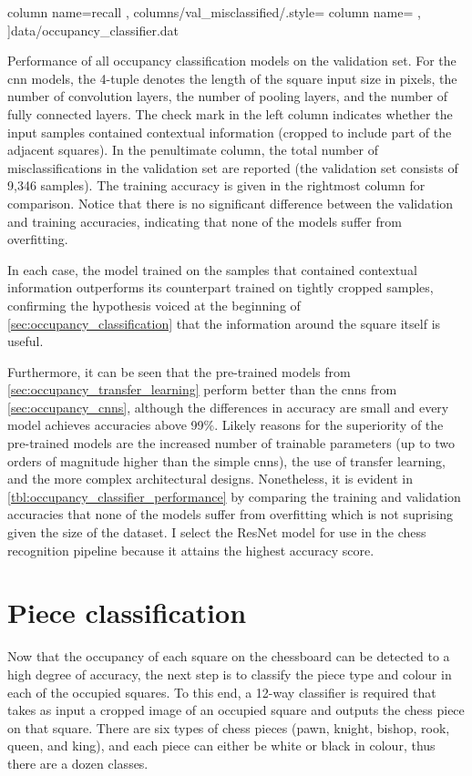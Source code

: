 \documentclass[../report.tex]{subfiles}
\begin{document}
\begin{table}
{{                column name={recall}
            },
            columns/val_misclassified/.style={
                column name={}
            },
        ]{data/occupancy_classifier.dat}
    }
    \caption[Performance of all occupancy classification models on the validation set.]{
        Performance of all occupancy classification models on the validation set.
        For the \gls{cnn} models, the 4-tuple denotes the length of the square input size in pixels, the number of convolution layers, the number of pooling layers, and the number of fully connected layers.
        The check mark in the left column indicates whether the input samples contained contextual information (cropped to include part of the adjacent squares).
        In the penultimate column, the total number of misclassifications in the validation set are reported (the validation set consists of 9,346 samples).
        The training accuracy is given in the rightmost column for comparison.
        Notice that there is no significant difference between the validation and training accuracies, indicating that none of the models suffer from overfitting.
    }
    \label{tbl:occupancy_classifier_performance}
\end{table}
In each case, the model trained on the samples that contained contextual information outperforms its counterpart trained on tightly cropped samples, confirming the hypothesis voiced at the beginning of \cref{sec:occupancy_classification} that the information around the square itself is useful.

Furthermore, it can be seen that the pre-trained models from \cref{sec:occupancy_transfer_learning} perform better than the \glspl{cnn} from \cref{sec:occupancy_cnns}, although the differences in accuracy are small and every model achieves accuracies above 99\%.
Likely reasons for the superiority of the pre-trained models are the increased number of trainable parameters (up to two orders of magnitude higher than the simple \glspl{cnn}), the use of transfer learning, and the more complex architectural designs.
Nonetheless, it is evident in \cref{tbl:occupancy_classifier_performance} by comparing the training and validation accuracies that none of the models suffer from overfitting which is not suprising given the size of the dataset.
I select the ResNet model for use in the chess recognition pipeline because it attains the highest accuracy score.


\section{Piece classification}
\label{sec:piece_classification}
Now that the occupancy of each square on the chessboard can be detected to a high degree of accuracy, the next step is to classify the piece type and colour in each of the occupied squares.
To this end, a 12-way classifier is required that takes as input a cropped image of an occupied square and outputs the chess piece on that square. 
There are six types of chess pieces (pawn, knight, bishop, rook, queen, and king), and each piece can either be white or black in colour, thus there are a dozen classes.
\end{document}
